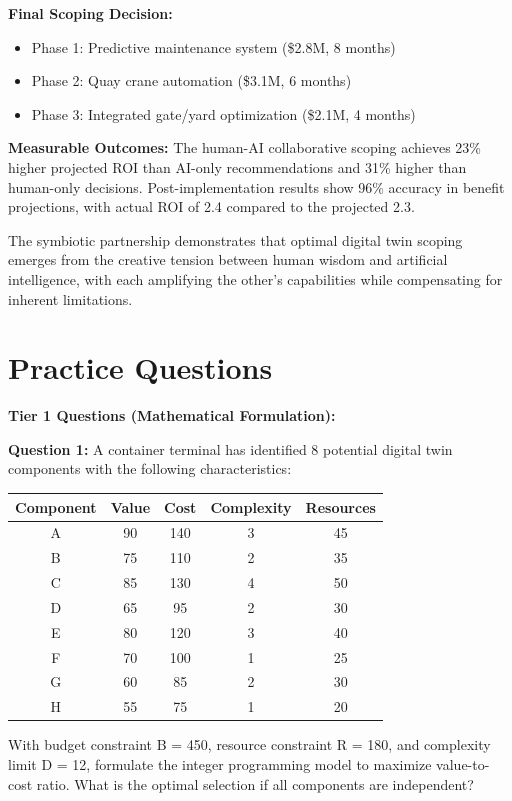\documentclass{article}
\begin{document}
\textbf{Final Scoping Decision:} 
\begin{itemize}
\item Phase 1: Predictive maintenance system (\$2.8M, 8 months)
\item Phase 2: Quay crane automation (\$3.1M, 6 months)  
\item Phase 3: Integrated gate/yard optimization (\$2.1M, 4 months)
\end{itemize}

\textbf{Measurable Outcomes:} The human-AI collaborative scoping achieves 23\% higher projected ROI than AI-only recommendations and 31\% higher than human-only decisions. Post-implementation results show 96\% accuracy in benefit projections, with actual ROI of 2.4 compared to the projected 2.3.

The symbiotic partnership demonstrates that optimal digital twin scoping emerges from the creative tension between human wisdom and artificial intelligence, with each amplifying the other's capabilities while compensating for inherent limitations.

\section{Practice Questions}

\textbf{Tier 1 Questions (Mathematical Formulation):}

\textbf{Question 1:} A container terminal has identified 8 potential digital twin components with the following characteristics:
\begin{center}
\begin{tabular}{|c|c|c|c|c|}
\hline
Component & Value & Cost & Complexity & Resources \\
\hline
A & 90 & 140 & 3 & 45 \\
B & 75 & 110 & 2 & 35 \\
C & 85 & 130 & 4 & 50 \\
D & 65 & 95 & 2 & 30 \\
E & 80 & 120 & 3 & 40 \\
F & 70 & 100 & 1 & 25 \\
G & 60 & 85 & 2 & 30 \\
H & 55 & 75 & 1 & 20 \\
\hline
\end{tabular}
\end{center}

With budget constraint B = 450, resource constraint R = 180, and complexity limit D = 12, formulate the integer programming model to maximize value-to-cost ratio. What is the optimal selection if all components are independent?
\end{document}
